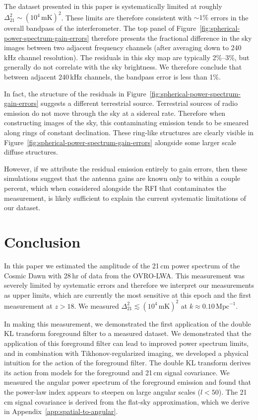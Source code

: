\begin{bibunit}
The dataset presented in this paper is systematically limited at roughly $\Delta_{21}^2 \sim
(10^4\,\text{mK})^2$. These limits are therefore consistent with $\sim 1\%$ errors in the overall
bandpass of the interferometer. The top panel of
Figure~\ref{fig:spherical-power-spectrum-gain-errors} therefore presents the fractional difference
in the sky images between two adjacent frequency channels (after averaging down to 240\,kHz channel
resolution). The residuals in this sky map are typically 2\%--3\%, but generally do not correlate
with the sky brightness. We therefore conclude that between adjacent 240\,kHz channels, the bandpass
error is less than 1\%.

In fact, the structure of the residuals in Figure~\ref{fig:spherical-power-spectrum-gain-errors}
suggests a different terrestrial source. Terrestrial sources of radio emission do not move through
the sky at a sidereal rate. Therefore when constructing images of the sky, this contaminating
emission tends to be smeared along rings of constant declination. These ring-like structures are
clearly visible in Figure~\ref{fig:spherical-power-spectrum-gain-errors} alongside some larger scale
diffuse structures.

However, if we attribute the residual emission entirely to gain errors, then these simulations
suggest that the antenna gains are known only to within a couple percent, which when considered
alongside the RFI that contaminates the measurement, is likely sufficient to explain the current
systematic limitations of our dataset.

\section{Conclusion}\label{sec:conclusion}

In this paper we estimated the amplitude of the 21\,cm power spectrum of the Cosmic Dawn with 28\,hr
of data from the OVRO-LWA. This measurement was severely limited by systematic errors and therefore
we interpret our measurements as upper limits, which are currently the most sensitive at this epoch
and the first measurement at $z > 18$. We measured $\Delta_{21}^2 \lesssim (10^4\,\text{mK})^2$ at
$k \approx 0.10\,\text{Mpc}^{-1}$.

In making this measurement, we demonstrated the first application of the double KL transform
foreground filter to a measured dataset. We demonstrated that the application of this foreground
filter can lead to improved power spectrum limits, and in combination with Tikhonov-regularized
imaging, we developed a physical intuition for the action of the foreground filter.  The double KL
transform derives its action from models for the foreground and 21\,cm signal covariance. We
measured the angular power spectrum of the foreground emission and found that the power-law index
appears to steepen on large angular scales ($l < 50$). The 21\,cm signal covariance is derived from
the flat-sky approximation, which we derive in Appendix~\ref{app:spatial-to-angular}.


\end{bibunit}
